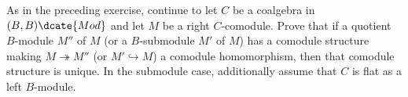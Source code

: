 	\item As in the preceding exercise, continue to let $C$ be a coalgebra in
	$(B,B)\dcate{Mod}$ and let $M$ be a right $C$-comodule. Prove that if a
	quotient $B$-module $M''$ of $M$ (or a $B$-submodule $M'$ of $M$) has a
	comodule structure making $M\twoheadrightarrow M''$ (or
	$M'\hookrightarrow M$) a comodule homomorphism, then that comodule
	structure is unique. In the submodule case, additionally assume that $C$
	is flat as a left $B$-module.
